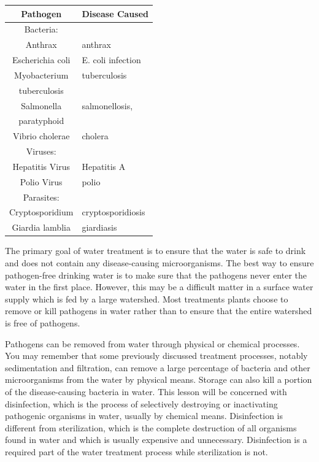 \documentclass[10pt]{article}
\begin{document}
\begin{tabular}{|c||l|}
\hline
\multicolumn{1}{|c|}{Pathogen} & \multicolumn{1}{c|}{Disease Caused} \\
\hline
Bacteria: &  \\
\hline\hline
Anthrax & anthrax \\
\hline\hline
Escherichia coli & E. coli infection \\
\hline\hline
Myobacterium & tuberculosis \\
tuberculosis &  \\
\hline\hline
Salmonella & salmonellosis, \\
paratyphoid &  \\
\hline\hline
Vibrio cholerae & cholera \\
\hline\hline
Viruses: &  \\
\hline\hline
Hepatitis Virus & Hepatitis A \\
\hline\hline
Polio Virus & polio \\
\hline\hline
Parasites: &  \\
\hline\hline
Cryptosporidium & cryptosporidiosis \\
\hline\hline
Giardia lamblia & giardiasis \\
\hline\hline
\end{tabular}

The primary goal of water treatment is to ensure that the water is safe to drink and does not contain any disease-causing microorganisms. The best way to ensure pathogen-free drinking water is to make sure that the pathogens never enter the water in the first place. However, this may be a difficult matter in a surface water supply which is fed by a large watershed. Most treatments plants choose to remove or kill pathogens in water rather than to ensure that the entire watershed is free of pathogens.

Pathogens can be removed from water through physical or chemical processes. You may remember that some previously discussed treatment processes, notably sedimentation and filtration, can remove a large percentage of bacteria and other microorganisms from the water by physical means. Storage can also kill a portion of the disease-causing bacteria in water. This lesson will be concerned with disinfection, which is the process of selectively destroying or inactivating pathogenic organisms in water, usually by chemical means. Disinfection is different from sterilization, which is the complete destruction of all organisms found in water and which is usually expensive and unnecessary. Disinfection is a required part of the water treatment process while sterilization is not.
\end{document}
